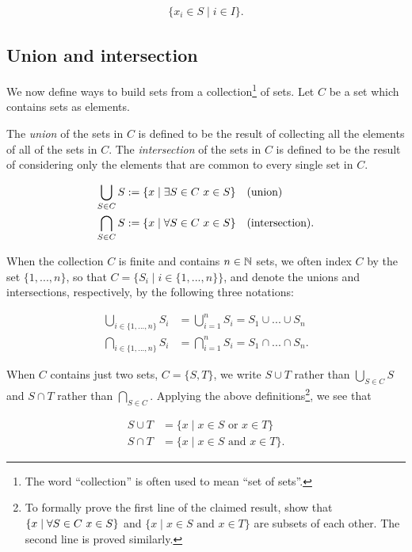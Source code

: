 \begin{align*}
    \{ x_i \in S \mid i \in I \}.
\end{align*}

\newpage

\subsection*{Union and intersection}

We now define ways to build sets from a collection\footnote{The word ``collection'' is often used to mean ``set of sets''.} of sets. Let $C$ be a set which contains sets as elements.

The \textit{union} of the sets in $C$ is defined to be the result of collecting all the elements of all of the sets in $C$. The \textit{intersection} of the sets in $C$ is defined to be the result of considering only the elements that are common to every single set in $C$.

\begin{align*}
    \bigcup_{S \in C} S &:= \{ x \mid \exists S \in C \text{ } x \in S \} \quad \text{(union)} \\
    \bigcap_{S \in C} S &:= \{ x \mid \forall S \in C \text{ } x \in S \} \quad \text{(intersection)}.
\end{align*}

When the collection $C$ is finite and contains $n \in \mathbb{N}$ sets, we often index $C$ by the set $\{1, ..., n\}$, so that $C = \{S_i \mid i \in \{1, ..., n\}\}$, and denote the unions and intersections, respectively, by the following three notations:

\begin{align*}
    \bigcup_{i \in \{1, ..., n\}} S_i &= \bigcup_{i = 1}^n S_i = S_1 \cup ... \cup S_n \\
    \bigcap_{i \in \{1, ..., n\}} S_i &= \bigcap_{i = 1}^n S_i = S_1 \cap ... \cap S_n.
\end{align*}

When $C$ contains just two sets, $C = \{S, T\}$, we write $S \cup T$ rather than $\bigcup_{S \in C} S$ and $S \cap T$ rather than $\bigcap_{S \in C}$. Applying the above definitions\footnote{To formally prove the first line of the claimed result, show that $ \{ x \mid \forall S \in C \text{ } x \in S \}$ and $\{x \mid x \in S \text{ and } x \in T\}$ are subsets of each other. The second line is proved similarly.}, we see that

\begin{align*}
    S \cup T &= \{x \mid x \in S \text{ or } x \in T\} \\
    S \cap T &= \{x \mid x \in S \text{ and } x \in T\}.
\end{align*}

